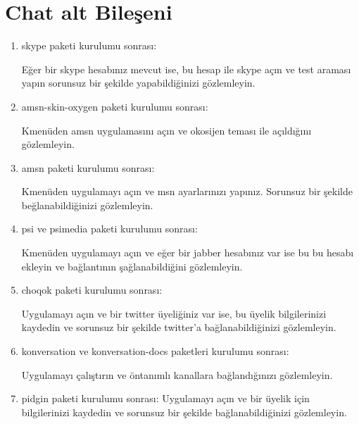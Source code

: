 \documentclass[a4paper,10pt]{article}
\begin{document}
\section{Chat alt Bileşeni}
\begin{enumerate}
\item skype paketi kurulumu sonrası:

Eğer bir skype hesabınız mevcut ise, bu hesap ile skype açın ve test araması yapın sorunsuz bir şekilde yapabildiğinizi gözlemleyin.
\item amsn-skin-oxygen paketi kurulumu sonrası:

Kmenüden amsn uygulamasını açın ve okosijen teması ile açıldığını gözlemleyin.

\item amsn paketi kurulumu sonrası:

Kmenüden uygulamayı açın ve msn ayarlarınızı yapınız. Sorunsuz bir şekilde beğlanabildiğinizi gözlemleyin.

\item psi ve psimedia paketi kurulumu sonrası:

Kmenüden uygulamayı açın ve eğer bir jabber hesabınız var ise bu bu hesabı ekleyin ve bağlantının şağlanabildiğini gözlemleyin.

\item choqok paketi kurulumu sonrası:

Uygulamayı açın ve bir twitter üyeliğiniz var ise, bu üyelik bilgilerinizi kaydedin ve sorunsuz bir şekilde twitter'a bağlanabildiğinizi gözlemleyin.	
\item konversation ve konversation-docs paketleri kurulumu sonrası:

Uygulamayı çalıştırın ve öntanımlı kanallara bağlandığınızı gözlemleyin.

\item pidgin paketi kurulumu sonrası:
Uygulamayı açın ve bir üyelik için bilgilerinizi kaydedin ve sorunsuz bir şekilde bağlanabildiğinizi gözlemleyin.

\end{enumerate}
\end{document}
